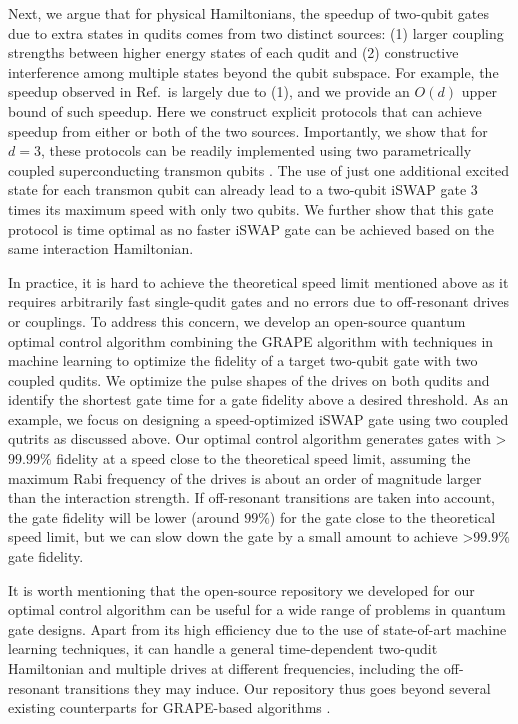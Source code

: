 \documentclass[twocolumn,english,pra,superscriptaddress]{revtex4-1}
\begin{document}
Next, we argue that for physical Hamiltonians, the speedup of two-qubit gates due to extra states in qudits comes from two distinct sources: (1) larger coupling strengths between higher energy states of each qudit and (2) constructive interference among multiple states beyond the qubit subspace. For example, the speedup observed in Ref.\,\cite{Ashhab} is largely due to (1), and we provide an $O(d)$ upper bound of such speedup. Here we construct explicit protocols that can achieve speedup from either or both of the two sources. Importantly, we show that for $d=3$, these protocols can be readily implemented using two parametrically coupled superconducting transmon qubits \cite{RayParam}. The use of just one additional excited state for each transmon qubit can already lead to a two-qubit iSWAP gate 3 times its maximum speed with only two qubits. We further show that this gate protocol is time optimal as no faster iSWAP gate can be achieved based on the same interaction Hamiltonian.

In practice, it is hard to achieve the theoretical speed limit mentioned above as it requires arbitrarily fast single-qudit gates and no errors due to off-resonant drives or couplings. To address this concern, we develop an open-source quantum optimal control algorithm combining the GRAPE algorithm \cite{GRAPE} with techniques in machine learning to optimize the fidelity of a target two-qubit gate with two coupled qudits. We optimize the pulse shapes of the drives on both qudits and identify the shortest gate time for a gate fidelity above a desired threshold. As an example, we focus on designing a speed-optimized iSWAP gate using two coupled qutrits as discussed above. Our optimal control algorithm generates gates with \textgreater $99.99\%$ fidelity at a speed close to the theoretical speed limit, assuming the maximum Rabi frequency of the drives is about an order of magnitude larger than the interaction strength. If off-resonant transitions are taken into account, the gate fidelity will be lower (around $99\%$) for the gate close to the theoretical speed limit, but we can slow down the gate by a small amount to achieve \textgreater $99.9\%$ gate fidelity.

It is worth mentioning that the open-source repository we developed for our optimal control algorithm can be useful for a wide range of problems in quantum gate designs. Apart from its high efficiency due to the use of state-of-art machine learning techniques, it can handle a general time-dependent two-qudit Hamiltonian and multiple drives at different frequencies, including the off-resonant transitions they may induce. Our repository thus goes beyond several existing counterparts for GRAPE-based algorithms \cite{qutip,Schuster1,Schuster2,LLNL1,LLNL2}.  
\end{document}
